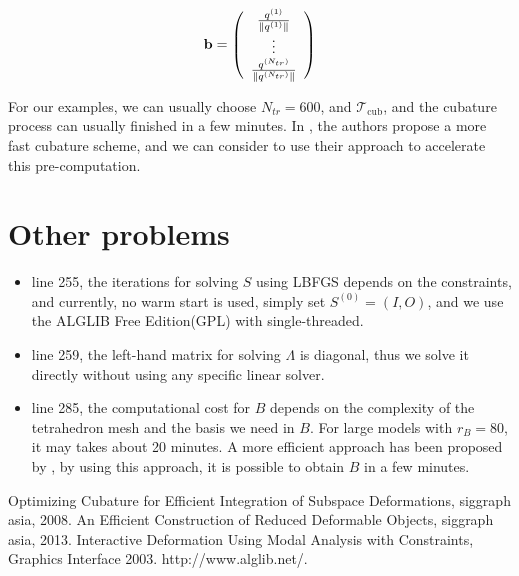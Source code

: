 \documentclass[9pt,twocolumn]{extarticle}
\begin{document}
\begin{equation} \label{nls}
  \bold{b} = \left( \begin{array}{ccccc}
      \frac{q^{(1)}}{\|q^{(1)}\|}\\
      \vdots\\
      \frac{q^{(N_{tr})}}{\|q^{(N_{tr})}\|}
    \end{array} \right)
\end{equation}

For our examples, we can usually choose $N_{tr}=600$, and
$\mathcal{T}_{\text{cub}}$, and the cubature process can usually finished in a
few minutes. In \cite{cubature2013}, the authors propose a more fast cubature
scheme, and we can consider to use their approach to accelerate this
pre-computation.

\section{Other problems}
\begin{itemize}
\item line 255, the iterations for solving $S$ using LBFGS depends on the
  constraints, and currently, no warm start is used, simply set $S^{(0)}=(I,O)$,
  and we use the ALGLIB Free Edition(GPL) with single-threaded\cite{lbfgs}.
\item line 259, the left-hand matrix for solving $\Lambda$ is diagonal, thus we
  solve it directly without using any specific linear solver.
\item line 285, the computational cost for $B$ depends on the complexity of the
  tetrahedron mesh and the basis we need in $B$. For large models with $r_B=80$,
  it may takes about 20 minutes. A more efficient approach has been proposed by
  \cite{cubature2013}, by using this approach, it is possible to obtain $B$ in a
  few minutes.
\end{itemize}


\begin{thebibliography}{99}
 Optimizing Cubature for Efficient Integration of Subspace
  Deformations, siggraph asia, 2008.
 An Efficient Construction of Reduced Deformable Objects,
  siggraph asia, 2013.
 Interactive Deformation Using Modal Analysis with Constraints,
  Graphics Interface 2003.
 http://www.alglib.net/.
\end{thebibliography}
\end{document}
